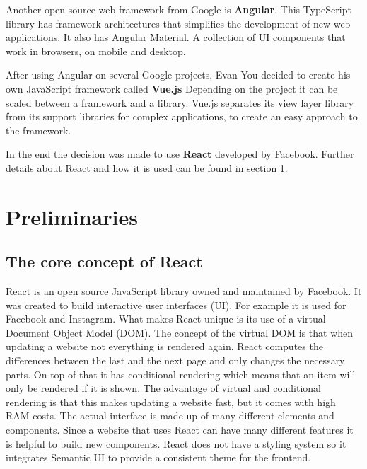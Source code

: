\documentclass[11pt,a4paper]{article}
\begin{document}
Another open source web framework from Google is \textbf{Angular}. \cite{angular}
This TypeScript library has framework architectures that simplifies the development of new web applications.
It also has Angular Material.
A collection of UI components that work in browsers, on mobile and desktop.

After using Angular on several Google projects, Evan You decided to create his own JavaScript framework called \textbf{Vue.js} \cite{vuewiki}
Depending on the project it can be scaled between a framework and a library.
Vue.js separates its view layer library from its support libraries for complex applications, to create an easy approach to the framework. \cite{vuegit}

In the end the decision was made to use \textbf{React} developed by Facebook. 
Further details about React and how it is used can be found in section \ref{preliminaries}. 


\section{Preliminaries} \label{preliminaries}
\subsection{The core concept of React} 
React is an open source JavaScript library owned and maintained by Facebook.	It was created to build interactive user interfaces (UI).
For example it is used for Facebook and Instagram.
What makes React unique is its use of a virtual Document Object Model (DOM). 
The concept of the virtual DOM is that when updating a website not everything is rendered again.
React computes the differences between the last and the next page and only changes the necessary parts.
On top of that it has conditional rendering which means that an item will only be rendered if it is shown.
The advantage of virtual and conditional rendering is that this makes updating a website fast, but it comes with high RAM costs.
The actual interface is made up of many different elements and components.
Since a website that uses React can have many different features it is helpful to build new components.
\cite{reactjs}
React does not have a styling system so it integrates  Semantic UI to provide a consistent theme for the frontend.
\end{document}
